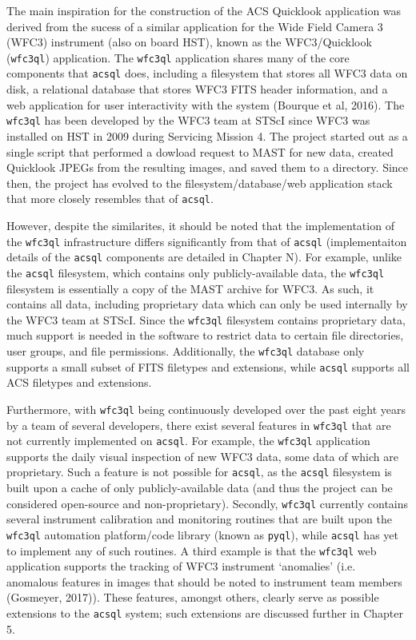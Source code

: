 \documentclass[10pt,journal,compsoc]{IEEEtran}
\begin{document}
The main inspiration for the construction of the ACS Quicklook application was derived from the sucess
of a similar application for the Wide Field Camera 3 (WFC3) instrument (also on board HST), known as the
WFC3/Quicklook (\texttt{wfc3ql}) application.  The \texttt{wfc3ql} application shares many of the core
components that \texttt{acsql} does, including a filesystem that stores all WFC3 data on disk, a relational
database that stores WFC3 FITS header information, and a web application for user interactivity with the
system (Bourque et al, 2016).  The \texttt{wfc3ql} has been developed by the WFC3 team at STScI since WFC3
was installed on HST in 2009 during Servicing Mission 4.  The project started out as a single script that
performed a dowload request to MAST for new data, created Quicklook JPEGs from the resulting images, and
saved them to a directory.  Since then, the project has evolved to the filesystem/database/web application stack
that more closely resembles that of \texttt{acsql}.

However, despite the similarites, it should be noted that the implementation of the \texttt{wfc3ql} infrastructure
differs significantly from that of \texttt{acsql} (implementaiton details of the \texttt{acsql} components are
detailed in Chapter N).  For example, unlike the \texttt{acsql} filesystem, which contains only publicly-available data, the
\texttt{wfc3ql} filesystem is essentially a copy of the MAST archive for WFC3.  As such, it contains all data,
including proprietary data which can only be used internally by the WFC3 team at STScI.  Since the \texttt{wfc3ql}
filesystem contains proprietary data, much support is needed in the software to restrict data to certain file
directories, user groups, and file permissions.  Additionally, the \texttt{wfc3ql} database only supports a small subset of
FITS filetypes and extensions, while \texttt{acsql} supports all ACS filetypes and extensions.

Furthermore, with \texttt{wfc3ql} being continuously developed over the past eight years by a team of several developers, there
exist several features in \texttt{wfc3ql} that are not currently implemented on \texttt{acsql}.  For example, the
\texttt{wfc3ql} application supports the daily visual inspection of new WFC3 data, some data of which are proprietary.  Such
a feature is not possible for \texttt{acsql}, as the \texttt{acsql} filesystem is built upon a cache of only publicly-available
data (and thus the project can be considered open-source and non-proprietary).  Secondly, \texttt{wfc3ql} currently contains
several instrument calibration and monitoring routines that are built upon the \texttt{wfc3ql} automation platform/code
library (known as \texttt{pyql}), while \texttt{acsql} has yet to implement any of such routines.  A third example is that
the \texttt{wfc3ql} web application supports the tracking of WFC3 instrument `anomalies' (i.e. anomalous features in images
that should be noted to instrument team members (Gosmeyer, 2017)). These features, amongst others, clearly serve as
possible extensions to the \texttt{acsql} system; such extensions are discussed further in Chapter 5.
\end{document}
